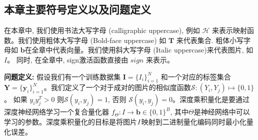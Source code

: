 \subsection{本章主要符号定义以及问题定义}
在本章中, 我们使用书法大写字母 (calligraphic uppercase), 例如 $\mathcal{H}$ 来表示映射函数。我们使用粗体大写字母 (Bold-face uppercase) 如 $\mathbf{T}$ 来代表集合. 粗体小写字母如 $\mathbf{b}$在全章中代表向量。我们使用斜大写字母 (Italic uppercase)来代表图片, 如 $\textit{I}$。 同时, 在全章中, sign激活函数直接由 $\textit{sign}$ 来表示。\par
\textbf{问题定义:} 假设我们有一个训练数据集 $\mathbf{I} = \{ I_i\}_{i = 1}^N$ 和一个对应的标签集合$\mathbf{Y} = \{\mathbf{y}_i\}_{i=1}^N$。我们定义了一个对于成对的图片的相似度函数$\mathcal{S}: (Y_i,Y_j) \mapsto \{0,1\}$。 如果 $y_i y_j^T > 0$ 则$\mathcal{S}(y_i,y_j) = 1$, 否则 $\mathcal{S}(y_i,y_j) = 0$。深度乘积量化是要通过深度神经网络学习一个复合量化器
$f_{\Theta}: I \rightarrow \mathbf{b} \in \{ 0,1 \}^B$, 其中$\Theta$是神经网络中可以学习的参数。深度乘积量化的目标是将图片$\it{I}$映射到二进制量化编码同时最小化量化误差。
